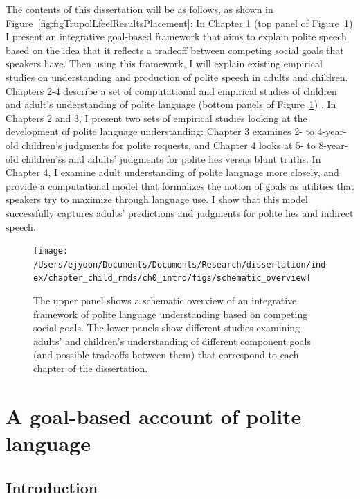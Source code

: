 \documentclass[oneside]{report}
\begin{document}
The contents of this dissertation will be as follows, as shown in
Figure~\ref{fig:figTrupolLfeelResultsPlacement}: In Chapter 1 (top panel
of Figure~\ref{fig:schematic-overview}) I present an integrative
goal-based framework that aims to explain polite speech based on the
idea that it reflects a tradeoff between competing social goals that
speakers have. Then using this framework, I will explain existing
empirical studies on understanding and production of polite speech in
adults and children. Chapters 2-4 describe a set of computational and
empirical studies of children and adult's understanding of polite
language (bottom panels of Figure~\ref{fig:schematic-overview}) . In
Chapters 2 and 3, I present two sets of empirical studies looking at the
development of polite language understanding: Chapter 3 examines 2- to
4-year-old children's judgments for polite requests, and Chapter 4 looks
at 5- to 8-year-old children'ss and adults' judgments for polite lies
versus blunt truths. In Chapter 4, I examine adult understanding of
polite language more closely, and provide a computational model that
formalizes the notion of goals as utilities that speakers try to
maximize through language use. I show that this model successfully
captures adults' predictions and judgments for polite lies and indirect
speech.
\begin{figure}[!t]

{\centering \texttt{[image: /Users/ejyoon/Documents/Documents/Research/dissertation/index/chapter\_child\_rmds/ch0\_intro/figs/schematic\_overview]} 

}

\caption[Schematic overview of the dissertation content.]{The upper panel shows a schematic overview of an integrative framework of polite language understanding based on competing social goals. The lower panels show different studies examining adults' and children's understanding of different component goals (and possible tradeoffs between them) that correspond to each chapter of the dissertation.}\label{fig:schematic-overview}
\end{figure}
\chapter{A goal-based account of polite
language}\label{a-goal-based-account-of-polite-language}


\section{Introduction}\label{introduction}
\end{document}
